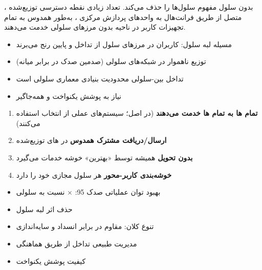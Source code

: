 

\CNchained{}

\CNchained{}

 بدون سلول مفهوم سلول‌ها را حذف می‌کند. تعداد زیادی نقطه دسترسی توزیع‌شده ، متصل از طریق فرانت‌هال به واحدهای پردازش مرکزی ، به‌طور همدوس به تمام تجهیزات کاربر  در ناحیه بدون مرزهای سلولی خدمت می‌دهند.


\begin{itemize}
\tightlist
\item
  مسیله لبه سلول: کاربران در مرزهای سلول از تداخل و  پایین رنج می‌برند
\item
  توزیع ناهموار  در شبکه‌های سلولی (صدمین صدک در برابر میانه)
\item
  تداخل بین-سلولی محدودیت بنیادی معماری سلولی است
\item
  نیاز به پوشش یکنواخت و همه‌جاگیر
\end{itemize}





\begin{enumerate}
\def\labelenumi{\arabic{enumi}.}
\tightlist
\item
  \textbf{تمام ها به تمام ها خدمت می‌دهند} (در اصل؛ سیستم‌های عملی از انتخاب  استفاده می‌کنند)
\item
  \textbf{ارسال/\allowbreak{}دریافت مشترک همدوس} در های توزیع‌شده
\item
  \textbf{بدون تحویل}   همیشه توسط «بهترین» خوشه  خدمات می‌گیرد
\item
  \textbf{خوشه‌بندی کاربر-محور}  هر  سلول مجازی خود را دارد
\end{enumerate}


\begin{itemize}
\tightlist
\item
  بهبود توان عملیاتی صدک 95: \ensuremath{\times} نسبت به سلولی
\item
  حذف اثر لبه سلول
\item
  تنوع کلان: مقاوم در برابر انسداد و سایه‌اندازی
\item
  مدیریت طبیعی تداخل از طریق هماهنگی
\item
  کیفیت پوشش یکنواخت
\end{itemize}

